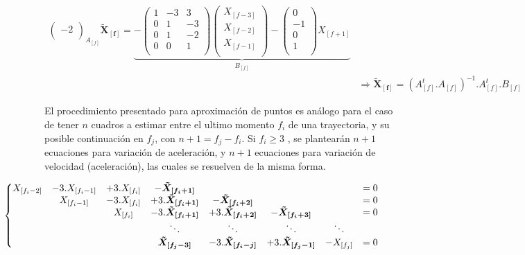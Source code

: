 \begin{equation}
\begin{split}
{\begin{pmatrix}
-2\\
\end{pmatrix}
}_{A_{[f]}}\boldsymbol{\tilde{X}_{[f]}} = \underbrace{- \begin{pmatrix}
1 &-3 &3\\
0 &1 &-3\\
0 &1 &-2\\
0 &0 &1\\
\end{pmatrix}
\begin{pmatrix}
X_{[f-3]}\\
X_{[f-2]}\\
X_{[f-1]}\\
\end{pmatrix} - \begin{pmatrix}
0\\
-1\\
0\\
1\\
\end{pmatrix}
X_{[f+1]}}_{B_{[f]}} \\
&\Rightarrow \boldsymbol{\tilde{X}_{[f]}} = \left( A_{[f]}^{t}.A_{[f]}\right)^{-1}.A_{[f]}^{t}.B_{[f]}
\end{split}
\label{matrices_estimacion_01}
\end{equation}

El procedimiento presentado para aproximación de puntos es análogo para el caso de tener $n$ cuadros a estimar entre el ultimo momento $f_{i}$ de una trayectoria, y su posible continuación en $f_{j}$, con $n+1=f_{j}-f_{i}$. Si $f_{i} \geq 3$ , se plantearán $n+1$ ecuaciones para variación de aceleración, y $n+1$ ecuaciones para variación de velocidad (aceleración), las cuales se resuelven de la misma forma. 

\begin{equation}
\hspace{-2cm}
\left\{
\begin{matrix}
X_{[f_{i}-2]} &-3.X_{[f_{i}-1]} &+3.X_{[f_{i}]} &-\boldsymbol{\tilde{X}_{[f_{i}+1]}} & & & &=0 \\
& X_{[f_{i}-1]} &-3.X_{[f_{i}]} &+3.\boldsymbol{\tilde{X}_{[f_{i}+1]}} &-\boldsymbol{\tilde{X}_{[f_{i}+2]}} & & &=0 \\
& & X_{[f_{i}]} &-3.\boldsymbol{\tilde{X}_{[f_{i}+1]}} &+3.\boldsymbol{\tilde{X}_{[f_{i}+2]}} &-\boldsymbol{\tilde{X}_{[f_{i}+3]}}& &=0 \\
& & & \ddots & \ddots & \ddots & \ddots & \\
& & & \boldsymbol{\tilde{X}_{[f_{j}-3]}} &-3.\boldsymbol{\tilde{X}_{[f_{i}-j]}} &+3.\boldsymbol{\tilde{X}_{[f_{j}-1]}} &-X_{[f_{j}]} &=0 \\
\end{matrix}
\right.
\label{ecuaciones_estimacion_n}
\end{equation}

